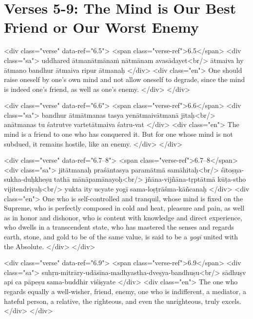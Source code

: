 \section{Verses 5-9: The Mind is Our Best Friend or Our Worst Enemy}\label{sec-verses-5-9-the-mind-is-our-best-friend-or-our-worst-enemy}


\begin{html}
<div class="verse" data-ref="6.5">
  <span class="verse-ref">6.5</span>
  <div class="sa">
    uddhared ātmanātmānaṁ nātmānam avasādayet<br/>
    ātmaiva hy ātmano bandhur ātmaiva ripur ātmanaḥ
  </div>
  <div class="en">
    One should raise oneself by one’s own mind and not allow oneself to degrade, since the mind is indeed one’s friend, as well as one’s enemy.
  </div>
</div>
\end{html}



\begin{html}
<div class="verse" data-ref="6.6">
  <span class="verse-ref">6.6</span>
  <div class="sa">
    bandhur ātmātmanas tasya yenātmaivātmanā jitaḥ<br/>
    anātmanas tu śatrutve vartetātmaiva śatru-vat
  </div>
  <div class="en">
    The mind is a friend to one who has conquered it. But for one whose mind is not subdued, it remains hostile, like an enemy.
  </div>
</div>
\end{html}



\begin{html}
<div class="verse" data-ref="6.7–8">
  <span class="verse-ref">6.7–8</span>
  <div class="sa">
    jitātmanaḥ praśāntasya paramātmā samāhitaḥ<br/>
    śītoṣṇa-sukha-duḥkheṣu tathā mānāpamānayoḥ<br/>
    jñāna-vijñāna-tṛptātmā kūṭa-stho vijitendriyaḥ<br/>
    yukta ity ucyate yogī sama-loṣṭrāśma-kāñcanaḥ
  </div>
  <div class="en">
    One who is self-controlled and tranquil, whose mind is fixed on the Supreme, who is perfectly composed in cold and heat, pleasure and pain, as well as in honor and dishonor, who is content with knowledge and direct experience, who dwells in a transcendent state, who has mastered the senses and regards earth, stone, and gold to be of the same value, is said to be a \textit{yogī} united with the Absolute.
  </div>
</div>
\end{html}



\begin{html}
<div class="verse" data-ref="6.9">
  <span class="verse-ref">6.9</span>
  <div class="sa">
    suhṛn-mitrāry-udāsīna-madhyastha-dveṣya-bandhuṣu<br/>
    sādhuṣv api ca pāpeṣu sama-buddhir viśiṣyate
  </div>
  <div class="en">
    The one who regards equally a well-wisher, friend, enemy, one who is indifferent, a mediator, a hateful person, a relative, the righteous, and even the unrighteous, truly excels.
  </div>
</div>
\end{html}


